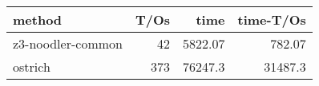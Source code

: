 \begin{tabular}{lrrr}
\hline
 method            &   T/Os &     time &   time-T/Os \\
\hline
 z3-noodler-common &     42 &  5822.07 &      782.07 \\
 ostrich           &    373 & 76247.3  &    31487.3  \\
\hline
\end{tabular}
